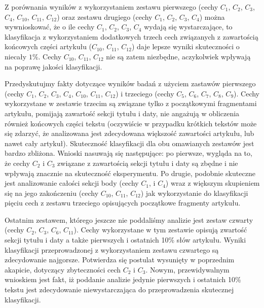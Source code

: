 \documentclass{classrep}
\begin{document}
Z porównania wyników z wykorzystaniem zestawu pierwszego (cechy $C_{1}$,  $C_{2}$,  $C_{3}$,  $C_{4}$,  $C_{10}$,  $C_{11}$,  $C_{12}$) oraz zestawu drugiego (cechy $C_{1}$,  $C_{2}$,  $C_{3}$,  $C_{4}$) można wywnioskować, że o ile cechy $C_{1}$,  $C_{2}$,  $C_{3}$,  $C_{4}$ wydają się wystarczające, to klasyfikacja z wykorzystaniem dodatkowych trzech cech związanych z zawartością końcowych części artykułu ($C_{10}$,  $C_{11}$,  $C_{12}$) daje lepsze wyniki skuteczności o niecały $1\%$. Cechy $C_{10}$,  $C_{11}$,  $C_{12}$ nie są zatem niezbędne, aczykolwiek wpływają na poprawę jakości klasyfikacji.\newline

Przedyskutujmy fakty dotyczące wyników badań z użyciem zastawów pierwszego (cechy $C_{1}$,  $C_{2}$,  $C_{3}$,  $C_{4}$,  $C_{10}$,  $C_{11}$,  $C_{12}$) i trzeciego (cechy $C_{5}$,  $C_{6}$,  $C_{7}$,  $C_{8}$,  $C_{9}$). Cechy wykorzystane w zestawie trzecim są związane tylko z początkowymi fragmentami artykułu, pomijają zawartość sekcji tytułu i daty, nie angażują w obliczenia również końcowych części tekstu (oczywiście w przypadku krótkich tekstów może się zdarzyć, że analizowana jest zdecydowana większość zawartości artykułu, lub nawet cały artykuł). Skuteczność klasyfikacji dla obu omawianych zestawów jest bardzo zbliżona. Wnioski nasuwają się następujące: po pierwsze, wygląda na to, że cechy $C_{2}$ i $C_{3}$ związane z zawartością sekcji tytułu i daty są zbędne i nie wpływają znacznie na skuteczność eksperymentu. Po drugie, podobnie skuteczne jest analizowanie całości sekcji body (cechy  $C_{1}$, i $C_{4}$) wraz z większym skupieniem się na jego zakończeniu (cechy $C_{10}$,  $C_{11}$,  $C_{12}$) jak wykorzystanie do klasyfikacji pięciu cech z zestawu trzeciego opisujących początkowe fragmenty artykułu. \newline

Ostatnim zestawem, którego jeszcze nie poddaliśmy analizie jest zestaw czwarty (cechy $C_{2}$,  $C_{3}$,  $C_{6}$,  $C_{11}$). Cechy wykorzystane w tym zestawie opisują zwartość sekcji tytułu i daty a także pierwszych i ostatnich 10\% słów artykułu. Wyniki klasyfikacji przeprowadzonej z wykorzystaniem zestawu czwartego są zdecydowanie najgorsze. Potwierdza się postulat wysunięty w poprzednim akapicie, dotyczący zbyteczności cech $C_{2}$ i $C_{3}$. Nowym, przewidywalnym wnioskiem jest fakt, iż poddanie analizie jedynie pierwszych i ostatnich 10\% tekstu jest zdecydowanie niewystarczająca do przeprowadzenia skutecznej klasyfikacji.
\end{document}
